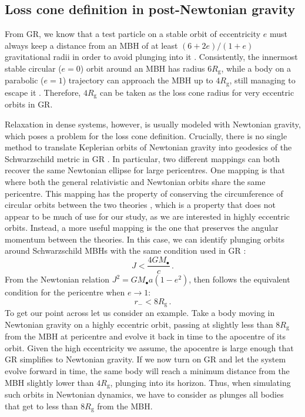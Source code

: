 \documentclass[desactivate]{aa}
\begin{document}
\subsection{Loss cone definition in post-Newtonian gravity}

        From GR, we know that a test particle on a stable orbit of eccentricity $e$ must always keep a distance from an MBH of at least $(6+2e)/(1+e)$ gravitational radii in order to avoid plunging into it \citep{1994PhRvD..50.3816C}. Consistently, the innermost stable circular ($e=0$) orbit around an MBH has radius $6 R_\mathrm{g}$, while a body on a parabolic ($e=1$) trajectory can approach the MBH up to $4 R_\mathrm{g}$, still managing to escape it \citep{1973grav.book.....M}. Therefore, $4 R_\mathrm{g}$ can be taken as the loss cone radius for very eccentric orbits in GR.

        Relaxation in dense systems, however, is usually modeled with Newtonian gravity, which poses a problem for the loss cone definition. Crucially, there is no single method to translate Keplerian orbits of Newtonian gravity into geodesics of the Schwarzschild metric in GR \citep{2017PhRvD..95h3001S}. In particular, two different mappings can both recover the same Newtonian ellipse for large pericentres. One mapping is that where both the general relativistic and Newtonian orbits share the same pericentre. This mapping has the property of conserving the circumference of circular orbits between the two theories \citep{2017PhRvD..95h3001S}, which is a property that does not appear to be much of use for our study, as we are interested in highly eccentric orbits. Instead, a more useful mapping is the one that preserves the angular momentum between the theories. In this case, we can identify plunging orbits around Schwarzschild MBHs with the same condition used in GR \citep{2011PhRvD..84d4024M,2011CQGra..28v5029S,2012CQGra..29u7001W,2013degn.book.....M}:
        \begin{equation}
            J < \frac{4GM_\bullet}{c} \, .
        \end{equation}
        From the Newtonian relation $J^2 = GM_\bullet a (1-e^2)$, then follows the equivalent condition for the pericentre when $e \to 1$:
        \begin{equation}
            r_- < 8 R_\mathrm{g} \, .
        \end{equation}
        To get our point across let us consider an example. Take a body moving in Newtonian gravity on a highly eccentric orbit, passing at slightly less than $8 R_\mathrm{g}$ from the MBH at pericentre and evolve it back in time to the apocentre of its orbit. Given the high eccentricity we assume, the apocentre is large enough that GR simplifies to Newtonian gravity. If we now turn on GR and let the system evolve forward in time, the same body will reach a minimum distance from the MBH slightly lower than $4 R_\mathrm{g}$, plunging into its horizon. Thus, when simulating such orbits in Newtonian dynamics, we have to consider as plunges all bodies that get to less than $8 R_\mathrm{g}$ from the MBH.
\end{document}
